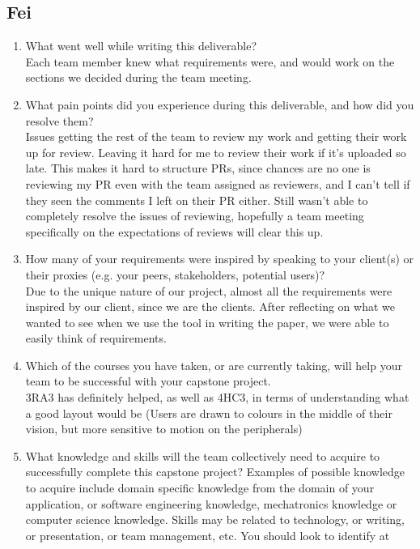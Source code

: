 \subsection*{Fei}
\begin{enumerate}
  \item What went well while writing this deliverable? \\
  Each team member knew what requirements were, and would work on the sections we decided during the team meeting.
  \item What pain points did you experience during this deliverable, and how did
  you resolve them? \\
  Issues getting the rest of the team to review my work and getting their work up for review. Leaving it hard for me to review their work if it's uploaded so late. This makes it hard to structure PRs, since chances are no one is reviewing my PR even with the team assigned as reviewers, and I can't tell if they seen the comments I left on their PR either. Still wasn't able to completely resolve the issues of reviewing, hopefully a team meeting specifically on the expectations of reviews will clear this up.
  \item How many of your requirements were inspired by speaking to your client(s) or their proxies (e.g. your peers, stakeholders, potential users)? \\
  Due to the unique nature of our project, almost all the requirements were inspired by our client, since we are the clients. After reflecting on what we wanted to see when we use the tool in writing the paper, we were able to easily think of requirements.
  \item Which of the courses you have taken, or are currently taking, will help your team to be successful with your capstone project. \\
  3RA3 has definitely helped, as well as 4HC3, in terms of understanding what a good layout would be (Users are drawn to colours in the middle of their vision, but more sensitive to motion on the peripherals)
  \item What knowledge and skills will the team collectively need to acquire to 
  successfully complete this capstone project?  Examples of possible knowledge
  to acquire include domain specific knowledge from the domain of your
  application, or software engineering knowledge, mechatronics knowledge or
  computer science knowledge.  Skills may be related to technology, or writing,
  or presentation, or team management, etc.  You should look to identify at

\end{enumerate}
